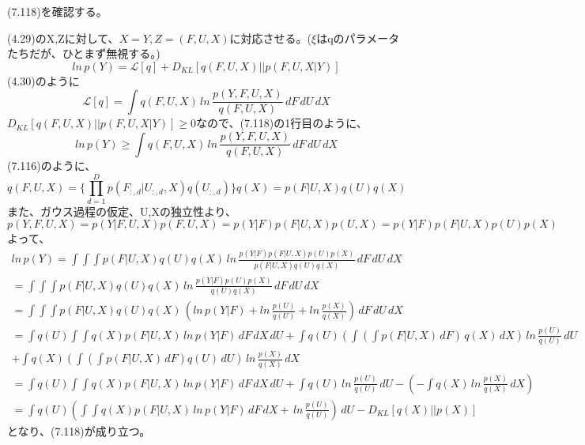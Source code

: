 \documentclass{jsarticle}
\begin{document}
(7.118)を確認する。

(4.29)のX,Zに対して、$X = Y, Z = (F, U, X)$に対応させる。($\xi$はqのパラメータたちだが、ひとまず無視する。)
\begin{equation}
ln \, p(Y) = \mathcal{L}[q] + D_{KL}[q(F, U, X) || p(F, U, X | Y)]
\end{equation}
(4.30)のように
\begin{equation}
\mathcal{L}[q] = \int q(F, U, X) \, ln \, \frac{p(Y, F, U, X)}{q(F, U, X)}\,dF\,dU\,dX
\end{equation}
$D_{KL}[q(F, U, X) || p(F, U, X | Y)] \geq 0$なので、(7.118)の1行目のように、
\begin{equation}
ln \, p(Y)  \geq \int q(F, U, X) \, ln \, \frac{p(Y, F, U, X)}{q(F, U, X)}\,dF\,dU\,dX
\end{equation}
(7.116)のように、
\begin{equation}
q(F, U, X) = \{ \prod_{d=1}^{D}p(F_{:, d} | U_{:, d}, X)q(U_{:, d})\}q(X) = p(F | U, X)q(U)q(X)
\end{equation}
また、ガウス過程の仮定、U,Xの独立性より、
\begin{equation}
p(Y, F, U, X) = p(Y | F, U, X)p(F, U, X) = p(Y | F)p(F | U, X)p(U, X) = p(Y | F)p(F | U, X)p(U)p(X)
\end{equation}
よって、
\begin{equation}
\begin{split}
ln \, p(Y)  = \int \int \int p(F | U, X)q(U)q(X) \, ln \, \frac{p(Y | F)p(F | U, X)p(U)p(X)}{p(F | U, X)q(U)q(X)}\,dF\,dU\,dX\\
= \int \int \int p(F | U, X)q(U)q(X) \, ln \, \frac{p(Y | F)p(U)p(X)}{q(U)q(X)}\,dF\,dU\,dX\\
= \int \int \int p(F | U, X)q(U)q(X) \, (ln \, p(Y | F) + ln \, \frac{p(U)}{q(U)} + ln \, \frac{p(X)}{q(X)})\,dF\,dU\,dX\\
= \int q(U) \int \int q(X)p(F | U, X) \,ln \, p(Y | F)\,dF\,dX\,dU
+ \int q(U) (\int (\int p(F | U, X)\,dF)\,q(X)\,dX)\, ln \, \frac{p(U)}{q(U)}\,dU\\
+ \int q(X) (\int (\int p(F | U, X)\,dF)q(U) \,dU)\,ln \, \frac{p(X)}{q(X)}\,dX\\
= \int q(U) \int \int q(X)p(F | U, X) \,ln \, p(Y | F)\,dF\,dX\,dU
+ \int q(U) \, ln \, \frac{p(U)}{q(U)}\,dU - (-\int q(X) \,ln \, \frac{p(X)}{q(X)}\,dX)\\
= \int q(U) (\int \int q(X)p(F | U, X) \,ln \, p(Y | F)\,dF\,dX + \, ln \, \frac{p(U)}{q(U)})\,dU - D_{KL}[q(X)||p(X)]
\end{split}
\end{equation}
となり、(7.118)が成り立つ。
\end{document}

